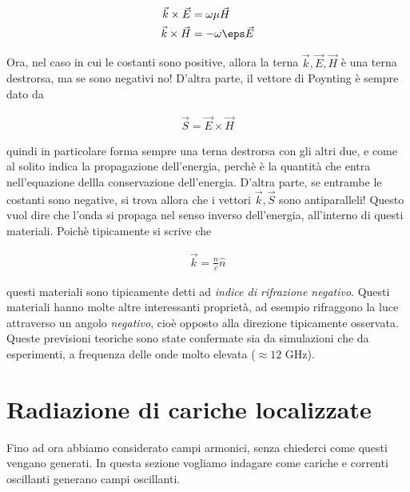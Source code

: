 \documentclass{report}
\begin{document}
    \begin{align}
        \vec{k}\times \vec{E} &= \omega \mu \vec{H} \\
        \vec{k}\times \vec{H} &= -\omega \eps \vec{E}
    \end{align}


    Ora, nel caso in cui le costanti sono positive, allora la terna \(\vec{k}, \vec{E}, \vec{H}\) è una terna destrorsa, ma se sono negativi no! D'altra parte, il vettore di Poynting è sempre dato da 

    \begin{align}
        \vec{S} = \vec{E} \times \vec{H}
    \end{align}

    quindi in particolare forma sempre una terna destrorsa con gli altri due, e come al solito indica la propagazione dell'energia, perchè è la quantità che entra nell'equazione dellla conservazione dell'energia. D'altra parte, se entrambe le costanti sono negative, si trova allora che i vettori \(\vec{k}, \vec{S}\) sono antiparalleli! Questo vuol dire che l'onda si propaga nel senso inverso dell'energia, all'interno di questi materiali. Poichè tipicamente si scrive che 

    \begin{align}
        \vec{k} = \frac{n}{c}\hat{n}
    \end{align}

    questi materiali sono tipicamente detti ad \emph{indice di rifrazione negativo}. Questi materiali hanno molte altre interessanti proprietà, ad esempio rifraggono la luce attraverso un angolo \emph{negativo}, cioè opposto alla direzione tipicamente osservata. Queste previsioni teoriche sono state confermate sia da simulazioni che da esperimenti, a frequenza delle onde molto elevata (\(\approx 12\) GHz).  

















    \chapter{Radiazione di cariche localizzate}

    Fino ad ora abbiamo considerato campi armonici, senza chiederci come questi vengano generati. In questa sezione vogliamo indagare come cariche e correnti oscillanti generano campi oscillanti. 
\end{document}
